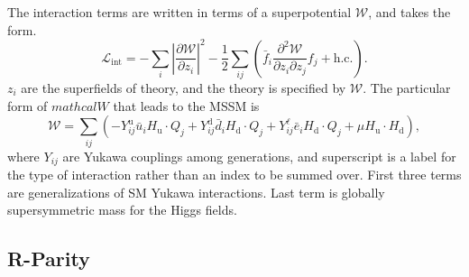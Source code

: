The interaction terms are written in terms of a superpotential $\mathcal{W}$,
and takes the form.
\begin{equation}
  \mathcal{L}_\mathrm{int} =
  - \sum_{i} \left| \frac{\partial \mathcal{W}}{\partial z_i} \right|^2
  - \frac{1}{2} \sum_{ij}
  \left( \bar{f}_i \frac{\partial^2 \mathcal{W}}{\partial z_i \partial z_j} f_j
  + \mathrm{h.c.} \right).
  \label{eqn:mssm_lagrange_int}
\end{equation}
$z_i$ are the superfields of theory, and the theory is specified by
$\mathcal{W}$.
The particular form of $mathcal{W}$ that leads to the MSSM is 
\begin{equation}
  \mathcal{W} =
  \sum_{ij}
  \left(
    - Y_{ij}^\mathrm{u} \bar{u}_i H_\mathrm{u} \cdot Q_j
    + Y_{ij}^\mathrm{d} \bar{d}_i H_\mathrm{d} \cdot Q_j
    + Y_{ij}^{\ell}     \bar{e}_i H_\mathrm{d} \cdot Q_j
    + \mu H_\mathrm{u} \cdot H_\mathrm{d}
  \right),
\end{equation}
where $Y_{ij}$ are Yukawa couplings among generations, and superscript is a
label for the type of interaction rather than an index to be summed over.
First three terms are generalizations of SM Yukawa interactions.
Last term is globally supersymmetric mass for the Higgs fields.

\FloatBarrier
\subsection{R-Parity}
\label{sec:r_parity}

